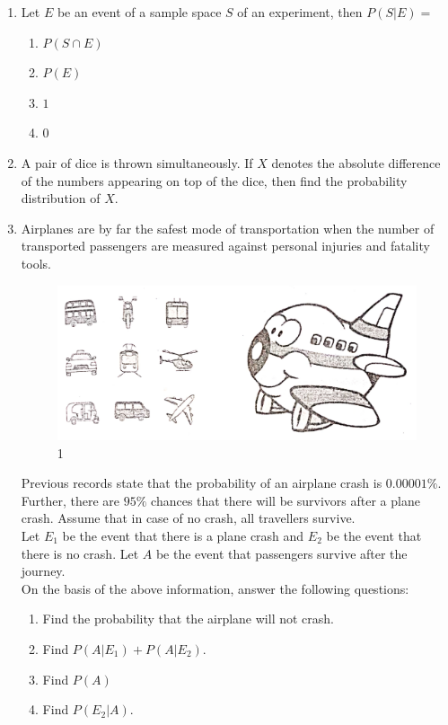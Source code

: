 \documentclass{article}
\begin{document}
\begin{enumerate}
	\item Let $E$ be an event of a sample space $S$ of an experiment, then $P(S|E)=$
		\begin{enumerate}
			\item $P(S \cap E)$
			\item $P(E)$
			\item $1$
			\item $0$
		\end{enumerate}
	\item A pair of dice is thrown simultaneously. If $X$ denotes the absolute difference of the numbers appearing on top of the dice, then find the probability distribution of $X$.
	\item Airplanes are by far the safest mode of transportation when the number of transported passengers are measured against personal injuries and fatality tools.
		\begin{figure}[h]
			\centering
			     \includegraphics[width=\columnwidth]{./Figuress/Air.jpg}
			     \caption{1}
			\label{Figure}
		\end{figure}
	      Previous records state that the probability of an airplane crash is $0.00001\%$. Further, there are $95\%$ chances that there will be survivors after a plane crash. Assume that in case of no crash, all travellers survive.\\
		Let $E_{1}$ be the event that there is a plane crash and $E_{2}$ be the event that there is no crash. Let $A$ be the event that passengers survive after the journey.\\
	      On the basis of the above information, answer the following questions:
		\begin{enumerate}[label=(\roman*)]
			\item Find the probability that the airplane will not crash.
			\item Find $P(A|E_{1}) + P(A|E_{2})$.
			\item Find $P(A)$
			\item Find $P(E_{2} | A)$.
		\end{enumerate}
\end{enumerate}
\end{document}
